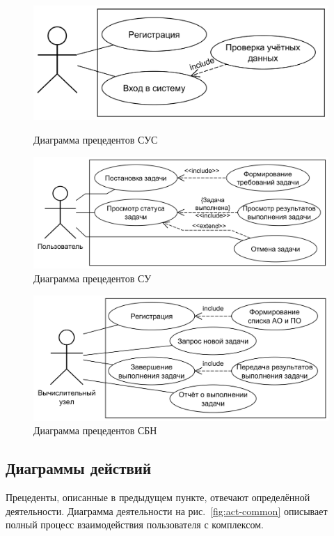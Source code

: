 \documentclass[a4paper,12pt]{report}
\numberwithin{equation}{section}
\begin{document}
\begin{figure}
  \centering
  \begin{minipage}{.49\linewidth}
    \centering
    \includegraphics[width=\linewidth]{../diagrams/session/usecase}
    \caption{Диаграмма прецедентов СУС}
    \label{fig:prec-session}
  \end{minipage}
  \hfill
  \begin{minipage}{.49\linewidth}
    \centering
    \includegraphics[width=\linewidth]{../diagrams/logic/usecase}
    \caption{Диаграмма прецедентов СУ}
    \label{fig:prec-logic}
  \end{minipage}  
\end{figure}

\begin{figure}
  \centering
  \includegraphics[width=.6\linewidth]{../diagrams/balancer/usecase}
  \caption{Диаграмма прецедентов СБН}
  \label{fig:prec-balancer}
\end{figure}

\subsection{Диаграммы действий}
Прецеденты, описанные в предыдущем пункте, отвечают определённой деятельности.
Диаграмма деятельности на рис.~\ref{fig:act-common} описывает полный процесс взаимодействия пользователя с комплексом.
\end{document}
